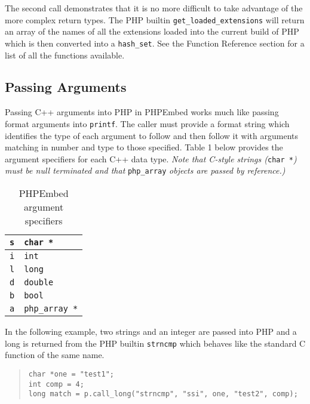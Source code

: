 \documentclass[11pt,titlepage]{article}
\begin{document}
The second call demonstrates that it is no more difficult to take advantage of the more complex return types. The PHP builtin \verb|get_loaded_extensions|  will return an array of the names of all the extensions loaded into the current build of PHP which is then converted into a \verb|hash_set|. See the Function Reference section for a list of all the functions available.

\subsection{Passing Arguments}

Passing C++ arguments into PHP in PHPEmbed works much like passing format arguments into \verb|printf|. The caller must provide a format string which identifies the type of each argument to follow and then follow it with arguments matching in number and type to those specified. Table 1 below provides the argument specifiers for each C++ data type. \emph{Note that C-style strings (}\verb|char *|\emph{) must be null terminated and that }\verb|php_array|\emph{ objects are passed by reference.)}

\begin{table}[!h]
\label{Table1}
\caption{PHPEmbed argument specifiers}
\begin{center}
\begin{tabular}{|r|l|}
\hline
\verb|s| & \verb|char *|\\
\hline
\verb|i| & \verb|int|\\
\hline
\verb|l| & \verb|long|\\
\hline
\verb|d| & \verb|double|\\
\hline
\verb|b| & \verb|bool|\\
\hline
\verb|a| & \verb|php_array *|\\
\hline
\end{tabular}
\end{center}
\end{table}

In the following example, two strings and an integer are passed into PHP and a long is returned from the PHP builtin \verb|strncmp| which behaves like the standard C function of the same name.

\begin{quote}
\begin{verbatim}
char *one = "test1";
int comp = 4;
long match = p.call_long("strncmp", "ssi", one, "test2", comp);
\end{verbatim}
\end{quote}
\end{document}
